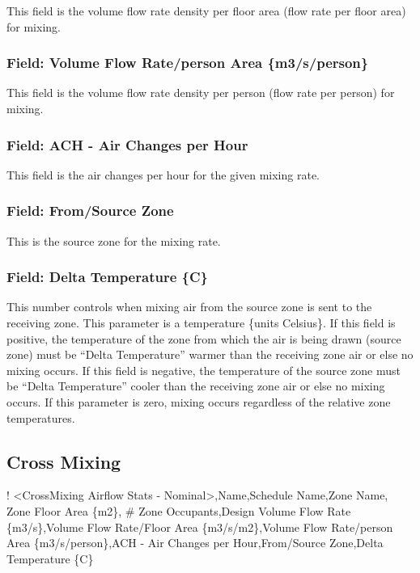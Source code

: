 This field is the volume flow rate density per floor area (flow rate per floor area) for mixing.

\subsubsection{Field: Volume Flow Rate/person Area \{m3/s/person\}}\label{field-volume-flow-rateperson-area-m3sperson-1}

This field is the volume flow rate density per person (flow rate per person) for mixing.

\subsubsection{Field: ACH - Air Changes per Hour}\label{field-ach---air-changes-per-hour-2}

This field is the air changes per hour for the given mixing rate.

\subsubsection{Field: From/Source Zone}\label{field-fromsource-zone}

This is the source zone for the mixing rate.

\subsubsection{Field: Delta Temperature \{C\}}\label{field-delta-temperature-c}

This number controls when mixing air from the source zone is sent to the receiving zone. This parameter is a temperature \{units Celsius\}. If this field is positive, the temperature of the zone from which the air is being drawn (source zone) must be ``Delta Temperature'' warmer than the receiving zone air or else no mixing occurs. If this field is negative, the temperature of the source zone must be ``Delta Temperature'' cooler than the receiving zone air or else no mixing occurs. If this parameter is zero, mixing occurs regardless of the relative zone temperatures.

\subsection{Cross Mixing}\label{cross-mixing}

! \textless{}CrossMixing Airflow Stats - Nominal\textgreater{},Name,Schedule Name,Zone Name, Zone Floor Area \{m2\}, \# Zone Occupants,Design Volume Flow Rate \{m3/s\},Volume Flow Rate/Floor Area \{m3/s/m2\},Volume Flow Rate/person Area \{m3/s/person\},ACH - Air Changes per Hour,From/Source Zone,Delta Temperature \{C\}


